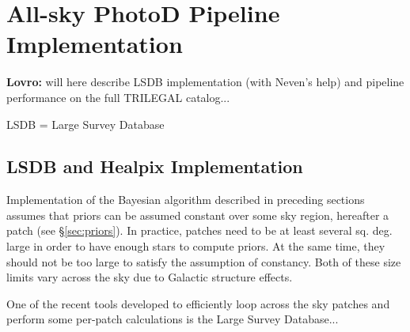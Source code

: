 

\section{All-sky PhotoD Pipeline Implementation \label{sec:LSDBpipe}}


{\bf Lovro:} will here describe LSDB implementation (with Neven's help) and pipeline performance on the full TRILEGAL catalog...

LSDB = Large Survey Database 


\subsection{LSDB and Healpix Implementation} 

Implementation of the Bayesian algorithm described in preceding sections assumes that priors can be assumed constant
over some sky region, hereafter a patch (see \S\ref{sec:priors}). In practice,  patches need to be at least several sq. deg.
large in order to have enough stars to compute priors. At the same time, they should not be too large to satisfy the assumption
of constancy. Both of these size limits vary across the sky due to Galactic structure effects. 

One of the recent tools developed to efficiently loop across the sky patches and perform some per-patch calculations
is the  Large Survey Database...
 